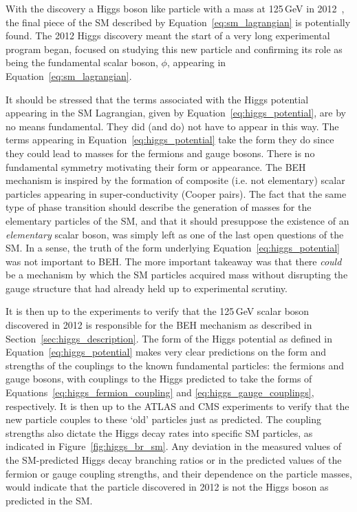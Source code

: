 With the discovery a Higgs boson like particle with a mass at 125\,GeV in 2012~\cite{HDiscoveryATLAS,HDiscoveryCMS},
the final piece of the SM described by Equation~\ref{eq:sm_lagrangian} is potentially found.
The 2012 Higgs discovery meant the start of a very long experimental program began, focused
on studying this new particle and confirming its role as being the fundamental scalar boson, $\phi$,
appearing in Equation~\ref{eq:sm_lagrangian}.

It should be stressed that the terms associated with the Higgs potential appearing in the SM
Lagrangian, given by Equation~\ref{eq:higgs_potential}, are by no means fundamental.
They did (and do) not have to appear in this way.
The terms appearing in Equation~\ref{eq:higgs_potential} take the form they do since they
could lead to masses for the fermions and gauge bosons.
There is no fundamental symmetry motivating their form or appearance.
The BEH mechanism is inspired by the formation of composite (i.e. not elementary) scalar particles
appearing in super-conductivity (Cooper pairs).
The fact that the same type of phase transition should describe the generation of masses for
the elementary particles of the SM, and that it should presuppose the existence of an \textit{elementary}
scalar boson, was simply left as one of the last open questions of the SM.
In a sense, the truth of the form underlying Equation~\ref{eq:higgs_potential} was not important to BEH.
The more important takeaway was that there \textit{could} be a mechanism by which the SM particles acquired
mass without disrupting the gauge structure that had already held up to experimental scrutiny.

It is then up to the experiments to verify that the 125\,GeV scalar boson discovered in 2012
is responsible for the BEH mechanism as described in Section~\ref{sec:higgs_description}.
The form of the Higgs potential as defined in Equation~\ref{eq:higgs_potential} makes
very clear predictions on the form and strengths of the couplings to the known fundamental particles:
the fermions and gauge bosons, with couplings to the Higgs predicted to take the forms
of Equations~\ref{eq:higgs_fermion_coupling} and \ref{eq:higgs_gauge_couplings}, respectively.
It is then up to the ATLAS and CMS experiments to verify that the new particle couples
to these `old' particles just as predicted.
The coupling strengths also dictate the Higgs decay rates into specific SM particles, as indicated
in Figure~\ref{fig:higgs_br_sm}.
Any deviation in the measured values of the SM-predicted Higgs decay branching ratios or
in the predicted values of the fermion or gauge coupling strengths, and their dependence on the
particle masses, would indicate that the particle discovered in 2012 is not the Higgs boson as predicted
in the SM.

